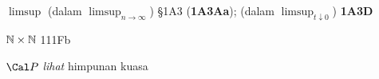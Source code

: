 $\limsup$ (dalam $\limsup_{n\to\infty}$) \S1A3 ({\bf 1A3Aa});
  (dalam $\limsup_{t\downarrow 0}$) {\bf 1A3D}
















































































\indexmedskip
{}



$\Bbb N\times\Bbb N$ 111Fb























\indexmedskip
{}



$\Cal P$ {\it lihat} himpunan kuasa

























